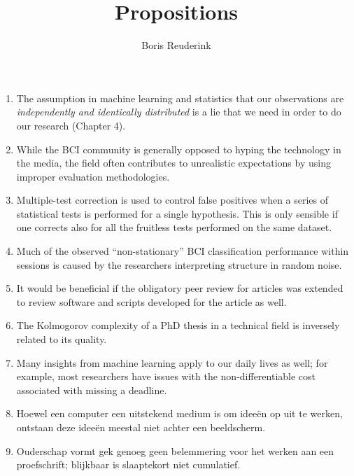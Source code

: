 \documentclass[a5paper]{article}
\title{Propositions}
\author{Boris Reuderink}
\begin{document}
\maketitle
\thispagestyle{empty}

\begin{enumerate}
\item The assumption in machine learning and statistics that our observations
are \emph{independently and identically distributed} is a lie that we need in order to do our research (Chapter 4).

\item While the BCI community is generally opposed to hyping the technology in
the media, the field often contributes to unrealistic expectations by using
improper evaluation methodologies.

\item Multiple-test correction is used to control false positives when a series
of statistical tests is performed for a single hypothesis. This is only
sensible if one corrects also for all the fruitless tests performed on the same
dataset.

\item Much of the observed ``non-stationary'' BCI classification performance
within sessions is caused by the researchers interpreting structure in random
noise.

\item It would be beneficial if the obligatory peer review for articles was
extended to review software and scripts developed for the article as well.

\item The Kolmogorov complexity of a PhD thesis in a technical field is
inversely related to its quality.

\item Many insights from machine learning apply to our daily lives as well; for
example, most researchers have issues with the non-differentiable cost associated with missing a deadline.

\item Hoewel een computer een uitstekend medium is om ideeën op uit te wer\-ken, ontstaan deze ideeën meestal niet achter een beeldscherm.

\item Ouderschap vormt gek genoeg geen belemmering voor het werken aan een
proefschrift; blijkbaar is slaaptekort niet cumulatief.


\end{enumerate}
\end{document}
